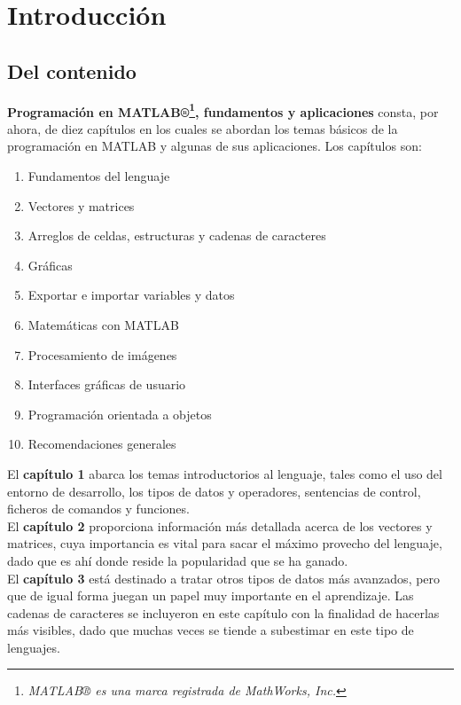\chapter*{Introducción}

\section*{Del contenido}

\textbf{Programación en MATLAB®\footnote{\emph{MATLAB® es una marca
  registrada de MathWorks, Inc.}}, fundamentos y aplicaciones} consta,
por ahora, de diez capítulos en los cuales se abordan los temas básicos
de la programación en MATLAB y algunas de sus aplicaciones. Los
capítulos son:

\begin{enumerate}
\item
  Fundamentos del lenguaje
\item
  Vectores y matrices
\item
  Arreglos de celdas, estructuras y cadenas de caracteres
\item
  Gráficas
\item
  Exportar e importar variables y datos
\item
  Matemáticas con MATLAB
\item
  Procesamiento de imágenes
\item
  Interfaces gráficas de usuario
\item
  Programación orientada a objetos
\item
  Recomendaciones generales
\end{enumerate}

El \textbf{capítulo 1} abarca los temas introductorios al lenguaje,
tales como el uso del entorno de desarrollo, los tipos de datos y
operadores, sentencias de control, ficheros de comandos y funciones. \\

El \textbf{capítulo 2} proporciona información más detallada acerca de
los vectores y matrices, cuya importancia es vital para sacar el máximo
provecho del lenguaje, dado que es ahí donde reside la popularidad que
se ha ganado. \\

El \textbf{capítulo 3} está destinado a tratar otros tipos de datos más
avanzados, pero que de igual forma juegan un papel muy importante en el
aprendizaje. Las cadenas de caracteres se incluyeron en este capítulo
con la finalidad de hacerlas más visibles, dado que muchas veces se
tiende a subestimar en este tipo de lenguajes. \\

